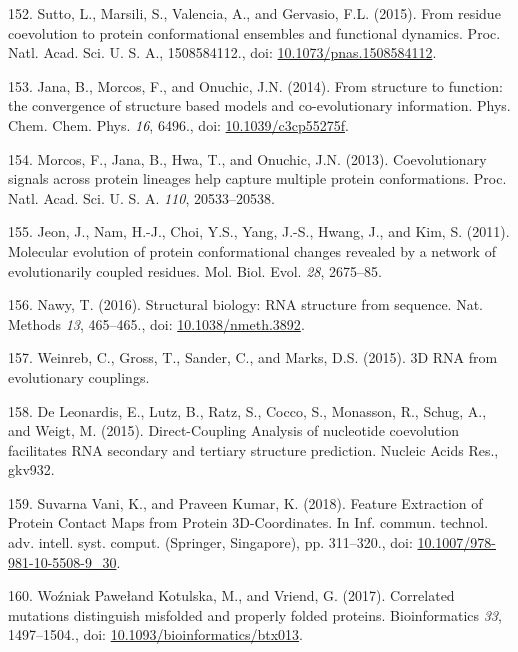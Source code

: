 \documentclass[11pt,a4paper,twoside]{book}
\theoremstyle{definition}
\theoremstyle{definition}
\theoremstyle{remark}
\begin{document}
\hypertarget{ref-Sutto2015}{}
152. Sutto, L., Marsili, S., Valencia, A., and Gervasio, F.L. (2015).
From residue coevolution to protein conformational ensembles and
functional dynamics. Proc. Natl. Acad. Sci. U. S. A., 1508584112., doi:
\href{https://doi.org/10.1073/pnas.1508584112}{10.1073/pnas.1508584112}.

\hypertarget{ref-Jana2014}{}
153. Jana, B., Morcos, F., and Onuchic, J.N. (2014). From structure to
function: the convergence of structure based models and co-evolutionary
information. Phys. Chem. Chem. Phys. \emph{16}, 6496., doi:
\href{https://doi.org/10.1039/c3cp55275f}{10.1039/c3cp55275f}.

\hypertarget{ref-Morcos2013a}{}
154. Morcos, F., Jana, B., Hwa, T., and Onuchic, J.N. (2013).
Coevolutionary signals across protein lineages help capture multiple
protein conformations. Proc. Natl. Acad. Sci. U. S. A. \emph{110},
20533--20538.

\hypertarget{ref-Jeon2011a}{}
155. Jeon, J., Nam, H.-J., Choi, Y.S., Yang, J.-S., Hwang, J., and Kim,
S. (2011). Molecular evolution of protein conformational changes
revealed by a network of evolutionarily coupled residues. Mol. Biol.
Evol. \emph{28}, 2675--85.

\hypertarget{ref-Nawy2016}{}
156. Nawy, T. (2016). Structural biology: RNA structure from sequence.
Nat. Methods \emph{13}, 465--465., doi:
\href{https://doi.org/10.1038/nmeth.3892}{10.1038/nmeth.3892}.

\hypertarget{ref-Weinreb2015}{}
157. Weinreb, C., Gross, T., Sander, C., and Marks, D.S. (2015). 3D RNA
from evolutionary couplings.

\hypertarget{ref-DeLeonardis2015a}{}
158. De Leonardis, E., Lutz, B., Ratz, S., Cocco, S., Monasson, R.,
Schug, A., and Weigt, M. (2015). Direct-Coupling Analysis of nucleotide
coevolution facilitates RNA secondary and tertiary structure prediction.
Nucleic Acids Res., gkv932.

\hypertarget{ref-SuvarnaVani2018}{}
159. Suvarna Vani, K., and Praveen Kumar, K. (2018). Feature Extraction
of Protein Contact Maps from Protein 3D-Coordinates. In Inf. commun.
technol. adv. intell. syst. comput. (Springer, Singapore), pp.
311--320., doi:
\href{https://doi.org/10.1007/978-981-10-5508-9_30}{10.1007/978-981-10-5508-9\_30}.

\hypertarget{ref-Wozniak2017}{}
160. Woźniak Pawełand Kotulska, M., and Vriend, G. (2017). Correlated
mutations distinguish misfolded and properly folded proteins.
Bioinformatics \emph{33}, 1497--1504., doi:
\href{https://doi.org/10.1093/bioinformatics/btx013}{10.1093/bioinformatics/btx013}.
\end{document}
